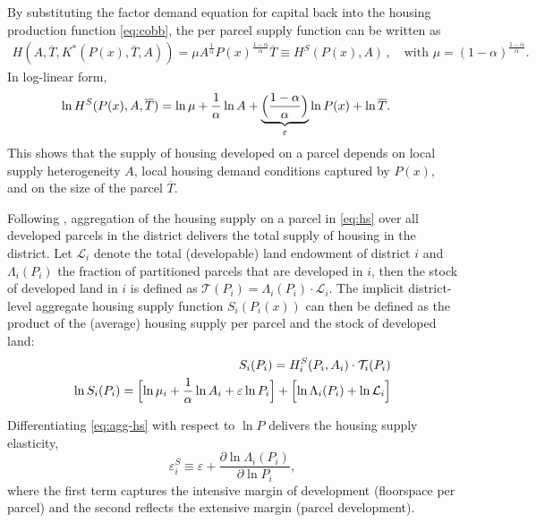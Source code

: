 \documentclass[
  12pt,
]{article}
\begin{document}
By substituting the factor demand equation for capital back into the housing production function \eqref{eq:cobb}, the per parcel supply function can be written as \[
\begin{aligned}
H(A, \overline{T}, K^*(P(x), \overline{T}, A))=\mu A^{\frac{1}{\alpha}}{P(x)}^{\frac{1-\alpha}{\alpha}}\overline{T} \equiv H^S(P(x), A)\,,\quad \text{with } \mu = (1-\alpha)^{\frac{1-\alpha}{\alpha}}.\end{aligned}\,\] In log-linear form, \begin{align}
\ln H^S(P(x), A, \overline{T}) &= \ln \mu + \frac{1}{\alpha}\ln A + \underbrace{\Bigl(\frac{1-\alpha}{\alpha}\Bigr)}_{\varepsilon}\ln P(x) + \ln \overline{T}.
\label{eq:hs}
\end{align} This shows that the supply of housing developed on a parcel depends on local supply heterogeneity \(A\), local housing demand conditions captured by \(P(x)\), and on the size of the parcel \(\overline{T}\).

Following \citet{baumsnow-han2019}, aggregation of the housing supply on a parcel in \eqref{eq:hs} over all developed parcels in the district delivers the total supply of housing in the district. Let \(\mathcal{L}_{i}\) denote the total (developable) land endowment of district \(i\) and \(\Lambda_i (P_i)\) the fraction of partitioned parcels that are developed in \(i\), then the stock of developed land in \(i\) is defined as \(\mathcal{T}(P_i) = \Lambda_i(P_i) \cdot \mathcal{L}_{i}\). The implicit district-level aggregate housing supply function \(S_i(P_i(x))\) can then be defined as the product of the (average) housing supply per parcel and the stock of developed land: \begin{align}
S_i(P_i) = H_i^S(P_i, A_i)\cdot \mathcal{T}_{i}(P_i)\\ 
\ln S_i(P_i) = \Bigl[\ln \mu_i + \frac{1}{\alpha}\ln A_i + \varepsilon\ln P_i \Bigr]+ \Bigl[\ln\Lambda_i(P_i) + \ln\mathcal{L}_i\Bigr]
\label{eq:agg-hs}
\end{align}

Differentiating \eqref{eq:agg-hs} with respect to \(\ln P\) delivers the housing supply elasticity, \begin{equation}
\varepsilon^S_{i} \equiv \varepsilon + \frac{\partial \ln\Lambda_i(P_i)}{\partial \ln P_i},
\label{eq:elasticity}
\end{equation} where the first term captures the intensive margin of development (floorspace per parcel) and the second reflects the extensive margin (parcel development).
\end{document}
